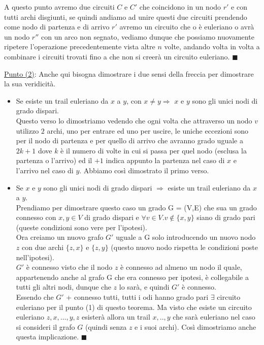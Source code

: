 \begin{demostration}
\begin{itemize}
    A questo punto avremo due circuiti $C$ e $C'$ che coincidono in un nodo $r'$ e con tutti archi disgiunti, se quindi andiamo ad unire questi due circuiti prendendo come nodo di partenza e di arrivo $r'$ avremo un circuito che o è euleriano o avrà un nodo $r''$ con un arco non segnato, vediamo dunque che possiamo nuovamente ripetere l'operazione precedentemente vista altre $n$ volte, andando volta in volta a combinare i circuiti trovati fino a che non si creerà un circuito euleriano. $\blacksquare$
\end{itemize}
\underline{Punto (2)}: Anche qui bisogna dimostrare i due sensi della freccia per dimostrare la sua veridicità.
\begin{itemize}
    \item Se esiste un trail euleriano da $x$ a $y$, con $x\neq y \Longrightarrow$ $x$ e $y$ sono gli unici nodi di grado dispari.\\
    Questo verso lo dimostriamo vedendo che ogni volta che attraverso un nodo $v$ utilizzo $2$ archi, uno per entrare ed uno per uscire, le uniche eccezioni sono per il nodo di partenza e per quello di arrivo che avranno grado uguale a $2k + 1$ dove $k$ è il numero di volte in cui si passa per quel nodo (esclusa la partenza o l'arrivo) ed il $+1$ indica appunto la partenza nel caso di $x$ e l'arrivo nel caso di $y$. Abbiamo così dimostrato il primo verso.
    \item Se $x$ e $y$ sono gli unici nodi di grado dispari $\Longrightarrow $ esiste un trail euleriano da $x$ a $y$.\\
    Prendiamo per dimostrare questo caso un grado G = (V,E) che sua un grado connesso con $x,y \in V$ di grado dispari e $\forall v \in V . v\notin \{x,y\}$ siano di grado pari (queste condizioni sono vere per l'ipotesi).\\
    Ora creiamo un nuovo grafo $G'$ uguale a G solo introducendo un nuovo nodo $z$ con due archi $\{z,x\}$ e $\{z,y\}$ (questo nuovo nodo rispetta le condizioni poste nell'ipotesi). \\
    $G'$ è connesso visto che il nodo $z$ è connesso ad almeno un nodo il quale, appartenendo anche al grafo G che era connesso per ipotesi, è collegabile a tutti gli altri nodi, dunque che $z$ lo sarà, e quindi $G'$ è connesso.\\
    Essendo che $G'$ + connesso tutti, tutti i odi hanno grado pari $\exists$ circuito euleriano per il punto (1) di questo teorema. Ma visto che esiste un circuito euleriano $z,x,\ldots,y,z$ esisterà allora un trail $x,..,y$ che sarà euleriano nel caso si consideri il grafo $G$ (quindi senza $z$ e i suoi archi). Così dimostriamo anche questa implicazione. $\blacksquare$
\end{itemize}
\end{demostration}


